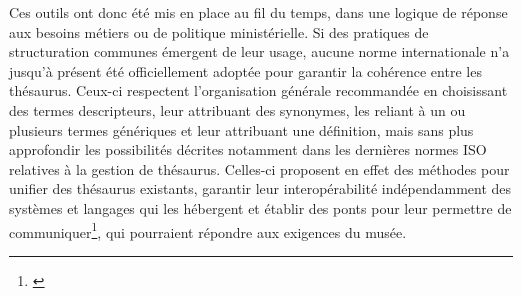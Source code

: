 \bigskip

Ces outils ont donc été mis en place au fil du temps, dans une logique de réponse aux besoins métiers ou de politique ministérielle. Si des pratiques de structuration communes émergent de leur usage, aucune norme internationale n’a jusqu’à présent été officiellement adoptée pour garantir la cohérence entre les thésaurus. Ceux-ci respectent l'organisation générale recommandée en choisissant des termes descripteurs, leur attribuant des synonymes, les reliant à un ou plusieurs termes génériques et leur attribuant une définition, mais sans plus approfondir les possibilités décrites notamment dans les dernières normes ISO relatives à la gestion de thésaurus. Celles-ci proposent en effet des méthodes pour unifier des thésaurus existants, garantir leur interopérabilité indépendamment des systèmes et langages qui les hébergent et établir des ponts pour leur permettre de communiquer\footnote{\cite{chichereau_normes_2007}}, qui pourraient répondre aux exigences du musée.